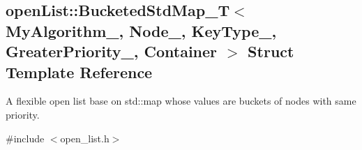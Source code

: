 \hypertarget{structopenList_1_1BucketedStdMap__T}{}\subsection{open\+List\+:\+:Bucketed\+Std\+Map\+\_\+T$<$ My\+Algorithm\+\_\+, Node\+\_\+, Key\+Type\+\_\+, Greater\+Priority\+\_\+, Container $>$ Struct Template Reference}
\label{structopenList_1_1BucketedStdMap__T}


A flexible open list base on {\ttfamily std\+::map} whose values are buckets of nodes with same priority.  




{\ttfamily \#include $<$open\+\_\+list.\+h$>$}

